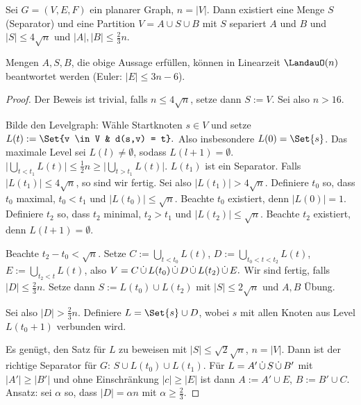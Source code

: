 \begin{st}
    Sei $G = (V, E, F)$ ein planarer Graph, $n = |V|$.
    Dann existiert eine Menge $S$ (Separator) und eine Partition $V = A \cup S \cup B$ mit $S$ separiert $A$ und $B$ und $|S| \le 4 \sqrt n$ und $|A|, |B| \le \frac{2}{3} n$.
    \begin{note}
        Mengen $A, S, B$, die obige Aussage erfüllen, können in Linearzeit $\LandauO(n)$ beantwortet werden (Euler: $|E| \le 3n - 6$).
    \end{note}
    \begin{proof}
        Der Beweis ist trivial, falls $n \le 4 \sqrt n$, setze dann $S := V$.
        Sei also $n > 16$.

        Bilde den Levelgraph:
        Wähle Startknoten $s \in V$ und setze
        \begin{math}
            L(t) := \Set{v \in V & d(s,v) = t}.
        \end{math}
        Also insbesondere $L(0) = \Set{s}$.
        Das maximale Level sei $L(l) \neq \emptyset$, sodass $L(l+1) = \emptyset$.
        \begin{math}
            \Big| \bigcup_{t<t_1} L(t) \Big|
            \le \frac{1}{2} n \ge
            \Big| \bigcup_{t>t_1} L(t) \Big|.
        \end{math}
        $L(t_1)$ ist ein Separator.
        Falls $|L(t_1)| \le 4 \sqrt n$, so sind wir fertig.
        Sei also $|L(t_1)| > 4 \sqrt n$.
        Definiere $t_0$ so, dass $t_0$ maximal, $t_0 < t_1$ und $|L(t_0)| \le \sqrt n$.
        Beachte $t_0$ existiert, denn $|L(0)| = 1$.
        Definiere $t_2$ so, dass $t_2$ minimal, $t_2 > t_1$ und $|L(t_2)| \le \sqrt n$.
        Beachte $t_2$ existiert, denn $L(l+1) = \emptyset$.

        Beachte $t_2 - t_0 < \sqrt n$. %
        Setze $C := \bigcup_{t<t_0} L(t)$, $D := \bigcup_{t_0 < t < t_2} L(t)$, $E := \bigcup_{t_2 < t} L(t)$, also
        \begin{math}
            V = C \mathop{\dot \cup} L(t_0) \mathop{\dot \cup} D \mathop{\dot \cup} L(t_2) \mathop{\dot \cup} E.
        \end{math}
        Wir sind fertig, falls $|D| \le \frac{2}{3} n$.
        Setze dann $S := L(t_0) \cup L(t_2)$ mit $|S| \le 2 \sqrt n$ und $A, B$ Übung.

        Sei also $|D| > \frac{2}{3}n$.
        Definiere $L = \Set{s} \cup D$, wobei $s$ mit allen Knoten aus Level $L(t_0 + 1)$ verbunden wird.

        Es genügt, den Satz für $L$ zu beweisen mit $|S| \le \sqrt 2\sqrt{n}$, $n = |V|$.
        Dann ist der richtige Separator für $G$: $S \cup L(t_0) \cup L(t_1)$.
        Für $L = A' \mathop{\dot \cup} S \mathop{\dot \cup} B'$ mit $|A'| \ge |B'|$ und ohne Einschränkung $|c| \ge |E|$ ist dann $A := A' \cup E$, $B := B' \cup C$.
        Ansatz: sei $\alpha$ so, dass $|D| = \alpha n$ mit $\alpha \ge \frac{2}{3}$.


\end{proof}
\end{st}
